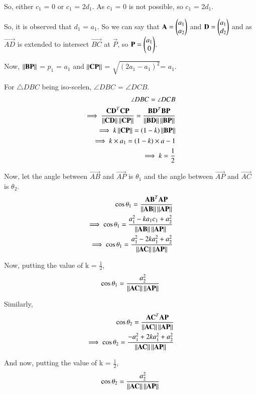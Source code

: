 \documentclass[journal,12pt,twocolumn]{IEEEtran}
\begin{document}
So, either $c_1$ = 0 or $c_1$ = 2$d_1$. As $c_1$ = 0 is not possible, so $c_1$ = 2$d_1$.

So, it is observed that $d_1$ = $a_1$.
So we can say that $\mathbf{A} = \begin{pmatrix}a_1\\a_2\end{pmatrix}$ and $\mathbf{D} = \begin{pmatrix}a_1\\d_2\end{pmatrix}$ and as $\vec{AD}$ is extended to intersect $\vec{BC}$ at $\vec{P}$, so $\mathbf{P} = \begin{pmatrix}a_1\\0\end{pmatrix}$.

Now, $\left\lVert\mathbf{BP}\right\rVert$ = $p_1$ = $a_1$ and $\left\lVert\mathbf{CP}\right\rVert$ = $\sqrt{(2a_1 - a_1)^2}$= $a_1$.

For $\triangle DBC$ being iso-scelen, $\angle DBC$ = $\angle DCB$. 
\begin{align}
\angle DBC = \angle DCB\\
\implies \frac{\mathbf{CD}^T \mathbf{CP}}{\left\lVert\mathbf{CD}\right\rVert\left\lVert\mathbf{CP}\right\rVert}=\frac{\mathbf{BD}^T \mathbf{BP}}{\left\lVert\mathbf{BD}\right\rVert\left\lVert\mathbf{BP}\right\rVert}\\
\implies k\left\lVert\mathbf{CP}\right\rVert = (1-k)\left\lVert\mathbf{BP}\right\rVert\\
\implies k \times a_1 = (1-k) \times a-1 \\
\implies k= \frac{1}{2}
\end{align}

Now, let the angle between $\vec{AB}$ and $\vec{AP}$ is $\theta_1$ and the angle between $\vec{AP}$ and $\vec{AC}$ is $\theta_2$.
\begin{align}
\cos\theta_1 = \frac{\mathbf{AB}^T \mathbf{AP}}{\left\lVert\mathbf{AB}\right\rVert\left\lVert\mathbf{AP}\right\rVert}\\
\implies \cos\theta_1 = \frac{a_1^2 - ka_1c_1 + a_2^2}{\left\lVert\mathbf{AB}\right\rVert\left\lVert\mathbf{AP}\right\rVert}\\
\implies \cos\theta_1 = \frac{a_1^2 - 2ka_1^2 + a_2^2}{\left\lVert\mathbf{AC}\right\rVert\left\lVert\mathbf{AP}\right\rVert}
\end{align}

Now, putting the value of k = $\frac{1}{2}$,
\begin{align}
\cos\theta_1 = \frac{a_2^2}{\left\lVert\mathbf{AC}\right\rVert\left\lVert\mathbf{AP}\right\rVert}
\end{align}

Similarly,
\begin{align}
\cos\theta_2 = \frac{\mathbf{AC}^T \mathbf{AP}}{\left\lVert\mathbf{AC}\right\rVert\left\lVert\mathbf{AP}\right\rVert}\\
\implies \cos\theta_2 = \frac{-a_1^2 + 2ka_1^2 + a_2^2}{\left\lVert\mathbf{AC}\right\rVert\left\lVert\mathbf{AP}\right\rVert}
\end{align}

And now, putting the value of k = $\frac{1}{2}$,
\begin{align}
 \cos\theta_2 = \frac{a_2^2}{\left\lVert\mathbf{AC}\right\rVert\left\lVert\mathbf{AP}\right\rVert}
\end{align}
\end{document}
